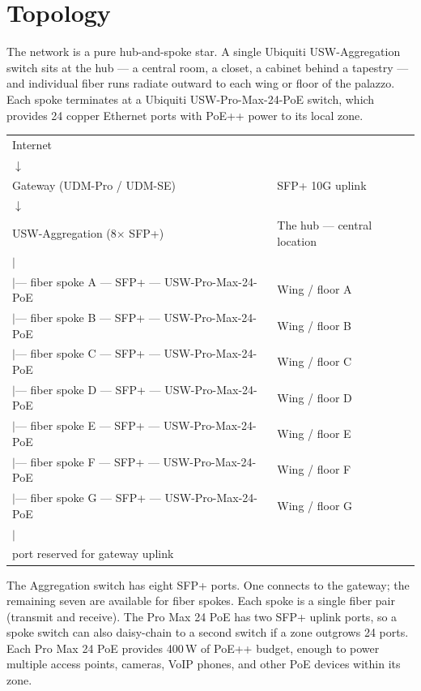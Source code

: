 \documentclass[]{anvil-proposal}
\begin{document}
\section{Topology}

The network is a pure hub-and-spoke star. A single Ubiquiti USW-Aggregation switch sits at the hub --- a central room, a closet, a cabinet behind a tapestry --- and individual fiber runs radiate outward to each wing or floor of the palazzo. Each spoke terminates at a Ubiquiti USW-Pro-Max-24-PoE switch, which provides 24 copper Ethernet ports with PoE++ power to its local zone.

\begin{metricbox}
\begin{tabularx}{\textwidth}{@{} >{\ttfamily\small}l @{\quad} l @{}}
Internet & \\
\quad$\downarrow$ & \\
Gateway (UDM-Pro / UDM-SE) & SFP+ 10G uplink \\
\quad$\downarrow$ & \\
USW-Aggregation (8$\times$ SFP+) & The hub --- central location \\
\quad$\mid$ & \\
\quad$\mid$--- fiber spoke A --- SFP+ --- USW-Pro-Max-24-PoE & Wing / floor A \\
\quad$\mid$--- fiber spoke B --- SFP+ --- USW-Pro-Max-24-PoE & Wing / floor B \\
\quad$\mid$--- fiber spoke C --- SFP+ --- USW-Pro-Max-24-PoE & Wing / floor C \\
\quad$\mid$--- fiber spoke D --- SFP+ --- USW-Pro-Max-24-PoE & Wing / floor D \\
\quad$\mid$--- fiber spoke E --- SFP+ --- USW-Pro-Max-24-PoE & Wing / floor E \\
\quad$\mid$--- fiber spoke F --- SFP+ --- USW-Pro-Max-24-PoE & Wing / floor F \\
\quad$\mid$--- fiber spoke G --- SFP+ --- USW-Pro-Max-24-PoE & Wing / floor G \\
\quad$\mid$ & \\
\quad 1 port reserved for gateway uplink & \\
\end{tabularx}
\end{metricbox}

The Aggregation switch has eight SFP+ ports. One connects to the gateway; the remaining seven are available for fiber spokes. Each spoke is a single fiber pair (transmit and receive). The Pro Max 24 PoE has two SFP+ uplink ports, so a spoke switch can also daisy-chain to a second switch if a zone outgrows 24 ports. Each Pro Max 24 PoE provides 400\,W of PoE++ budget, enough to power multiple access points, cameras, VoIP phones, and other PoE devices within its zone.
\end{document}
